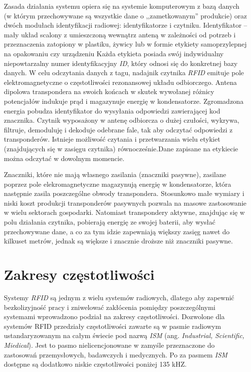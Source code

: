 Zasada działania systemu opiera się na systemie komputerowym z bazą danych (w którym przechowywane  są wszystkie dane o ,,zametkowanym” produkcie)  oraz dwóch modułach identyfikacji radiowej: identyfikatorze i czytniku. Identyfikator – mały układ scalony z umieszczoną wewnątrz anteną w zależności od potrzeb i przeznaczenia zatopiony w plastiku, żywicy lub w formie etykiety samoprzylepnej na opakowaniu czy urządzeniu Każda etykieta posiada swój indywidualny niepowtarzalny numer identyfikacyjny \emph{ID}, który odnosi się do konkretnej bazy danych. W celu odczytania danych z tagu, nadajnik czytnika \emph{RFID} emituje pole elektromagnetyczne o częstotliwości rezonansowej układu odbiorczego. Antena dipolowa transpondera na  swoich końcach w skutek wywołanej różnicy  potencjałów indukuje prąd i magazynuje energię w kondensatorze.  Zgromadzona energia pobudza identyfikator do wysyłania odpowiedzi zawierającej kod znacznika. 
Czytnik wyposażony w antenę odbiorcza o dużej czułości, wykrywa, filtruje, demoduluję i dekoduje odebrane fale, tak aby odczytać odpowiedzi z transponderów.
Istnieje możliwość czytania i przetwarzania wielu etykiet (znajdujących się w zasięgu czytnika) równocześnie.Dane zapisane na etykiecie można odczytać w dowolnym momencie. 

Znaczniki, które nie  mają własnego zasilania (znaczniki pasywne), zasilane poprzez pole elekromagnetyczne magazynują energię w kondensatorze, która następnie zasila poszczególne obwody transpondera. Stosunkowo małe wymiary i niski koszt  produkcji transponderów pasywnych pozwala na masowe zastosowanie w wielu sektorach gospodarki. Natomiast transpondery aktywne, znajdując się w polu działania czytnika, pobierają energię ze swojej baterii, aby wysłać przechowywane dane, a co za tym idzie zapewniają większy zasięg nawet do kilkuset metrów, jednak są większe i znacznie droższe niż znaczniki pasywne.

\newpage

\section{Zakresy częstotliwości}

Systemy \emph{RFID} są jednym z wielu systemów radiowych, dlatego aby zapewnić bezkolizyjność pracy i zniwelować zakłócenia pomiędzy poszczególnymi systemami wprowadzono podział na zakresy częstotliwości.  Dozwolone dla systemów RFID przedziały częstotliwości zawarte są w pasmie radiowym ustandaryzowanym na całym świecie pod nazwą \emph{ISM} (ang. \emph{Industrial, Scientific, Miedical}). Jest to pasmo nielicencjonowane w zamyśle przeznaczone do zastosowań przemysłowych, badawczych i medycznych. Po za pasmem \emph{ISM} dostępne są dodatkowo niskie częstotliwości poniżej 135 kHZ.

